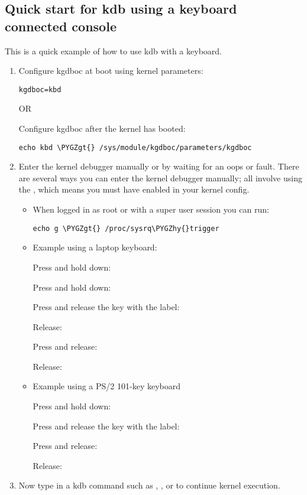 \documentclass[a4paper,8pt,english]{sphinxmanual}
\def\PYGZgt{\char`\>}
\def\PYGZhy{\char`\-}
\begin{document}
\subsection{Quick start for kdb using a keyboard connected console}
\label{dev-tools/kgdb:quick-start-for-kdb-using-a-keyboard-connected-console}
This is a quick example of how to use kdb with a keyboard.
\begin{enumerate}
\item {} 
Configure kgdboc at boot using kernel parameters:

\begin{Verbatim}[commandchars=\\\{\}]
kgdboc=kbd
\end{Verbatim}

OR

Configure kgdboc after the kernel has booted:

\begin{Verbatim}[commandchars=\\\{\}]
echo kbd \PYGZgt{} /sys/module/kgdboc/parameters/kgdboc
\end{Verbatim}

\item {} 
Enter the kernel debugger manually or by waiting for an oops or
fault. There are several ways you can enter the kernel debugger
manually; all involve using the , which means you must have
enabled  in your kernel config.
\begin{itemize}
\item {} 
When logged in as root or with a super user session you can run:

\begin{Verbatim}[commandchars=\\\{\}]
echo g \PYGZgt{} /proc/sysrq\PYGZhy{}trigger
\end{Verbatim}

\item {} 
Example using a laptop keyboard:

Press and hold down: 

Press and hold down: 

Press and release the key with the label: 

Release: 

Press and release: 

Release: 

\item {} 
Example using a PS/2 101-key keyboard

Press and hold down: 

Press and release the key with the label: 

Press and release: 

Release: 

\end{itemize}

\item {} 
Now type in a kdb command such as , ,  or  to
continue kernel execution.

\end{enumerate}
\end{document}
